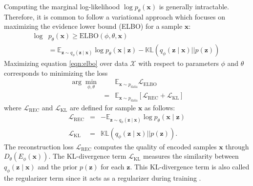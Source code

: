 \documentclass{article}
\def\bx{\mathbf{x}}
\def\bz{\mathbf{z}}
\theoremstyle{plain}
\theoremstyle{definition}
\begin{document}
Computing the marginal log-likelihood $\log p_{\theta}(\bx)$ is generally intractable. Therefore, it is common to follow a variational approach which focuses on maximizing the evidence lower bound (ELBO) for a sample  $\bx$:
\begin{equation}
\begin{split}
\log  &p_{\theta}(\bx) \geq  \textrm{ELBO}(\phi, \theta, \bx) \\
&= \mathbb{E}_{\bz \sim q_{\phi}(\bz \mid \bx)} \log p_{\theta}(\bx \mid \bz) - \mathbb{KL}(q_{\phi}(\bz \mid \bx) || p(\bz))
\end{split}
\label{eqn:elbo}
\end{equation}
Maximizing equation \ref{eqn:elbo} over data $\mathcal{X}$ with respect to parameters $\phi$ and $\theta$ corresponds to minimizing the loss
\begin{eqnarray}
\arg \min_{\phi, \theta} && \mathbb{E}_{\bx \sim p_{\textrm{data}}}  \mathcal{L}_{\textrm{ELBO}} \\
&=& \mathbb{E}_{\bx \sim p_{\textrm{data}}} \left[ \mathcal{L}_{\textrm{REC}} + \mathcal{L}_{\textrm{KL}} \right]
\end{eqnarray}
where $\mathcal{L}_{\textrm{REC}}$ and $\mathcal{L}_{\textrm{KL}}$ are defined for sample $\bx$ as follows:
\begin{eqnarray}
\mathcal{L}_{\textrm{REC}} &=& - \mathbb{E}_{\bz \sim q_{\phi}(\bz \mid \bx)} \log p_{\theta}(\bx \mid \bz) \\
\mathcal{L}_{\textrm{KL}} &=& \mathbb{KL}(q_{\phi}(\bz \mid \bx) || p(\bz)).
\label{eqn:L_rec_kl}
\end{eqnarray}
The reconstruction loss $\mathcal{L}_{\textrm{REC}}$ computes the quality of encoded samples $\bx$ through $D_{\theta} \left( E_{\phi}(\bx) \right)$. The KL-divergence term $\mathcal{L}_{\textrm{KL}}$ measures the similarity between $q_{\phi}(\bz \mid \bx)$ and the prior $p(\bz)$ for each $\bz$. This KL-divergence term is also called the regularizer term since it acts as a regularizer during training \cite{hoffman2016elbo}.
\end{document}
